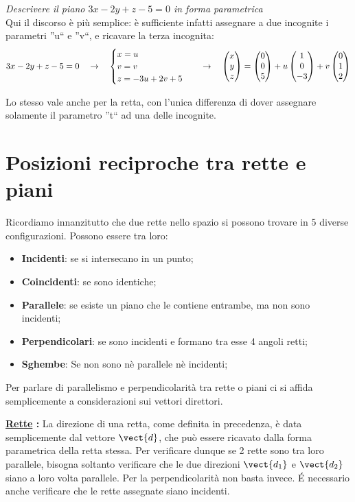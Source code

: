 \begin{esempio}
\emph{Descrivere il piano \(3x-2y+z-5=0\) in forma parametrica}\\[5pt]
Qui il discorso è più semplice: è sufficiente infatti assegnare a due incognite i parametri ''u`` e ''v``, e ricavare la terza incognita:
\[3x-2y+z-5=0 \quad \rightarrow \quad \begin{cases}
x = u \\
v = v \\
z = -3u+2v+5
\end{cases} \quad \rightarrow \quad \begin{pmatrix} x\\ y\\ z \end{pmatrix} =  \begin{pmatrix} 0\\ 0\\ 5 \end{pmatrix}+u \begin{pmatrix} 1\\ 0\\ -3 \end{pmatrix}+v \begin{pmatrix} 0\\ 1\\ 2 \end{pmatrix} \]
\end{esempio}
Lo stesso vale anche per la retta, con l'unica differenza di dover assegnare solamente il parametro ''t`` ad una delle incognite.

\section{Posizioni reciproche tra rette e piani}

Ricordiamo innanzitutto che due rette nello spazio si possono trovare in 5 diverse configurazioni. Possono essere tra loro:
\begin{itemize}
\item \textbf{Incidenti}: se si intersecano in un punto;
\item \textbf{Coincidenti}: se sono identiche;
\item \textbf{Parallele}: se esiste un piano che le contiene entrambe, ma non sono incidenti;
\item \textbf{Perpendicolari}: se sono incidenti e formano tra esse 4 angoli retti;
\item \textbf{Sghembe}: Se non sono nè parallele nè incidenti;
\end{itemize}

\vspace{7pt}

Per parlare di parallelismo e perpendicolarità tra rette o piani ci si affida semplicemente a considerazioni sui vettori direttori. 

\vspace{7pt}

\textbf{\underline{Rette} :} \;La direzione di una retta, come definita in precedenza, è data semplicemente dal vettore \(\vect{d}\), che può essere ricavato dalla forma parametrica della retta stessa. Per verificare dunque se 2 rette sono tra loro parallele, bisogna soltanto verificare che le due direzioni \(\vect{d_1}\) e \(\vect{d_2}\) siano a loro volta parallele. Per la perpendicolarità non basta invece. \'E necessario anche verificare che le rette assegnate siano incidenti.

